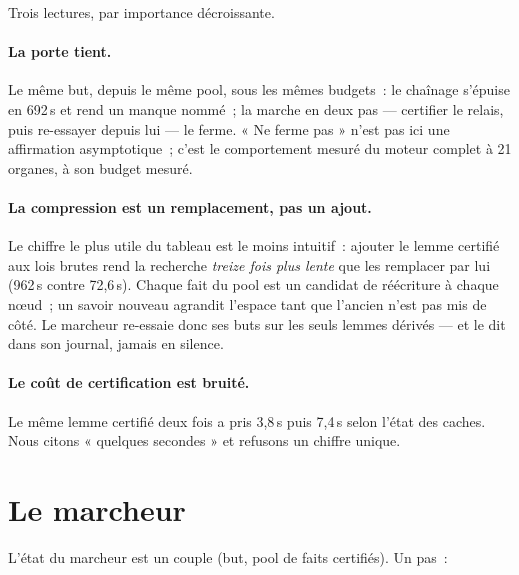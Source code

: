 \documentclass[11pt]{article}
\theoremstyle{remark}\newtheorem{remarque}{Remarque}
\begin{document}
Trois lectures, par importance décroissante.

\paragraph{La porte tient.} Le même but, depuis le même pool, sous les mêmes
budgets~: le chaînage s'épuise en 692\,s et rend un manque nommé~; la marche
en deux pas --- certifier le relais, puis re-essayer depuis lui --- le ferme.
« Ne ferme pas » n'est pas ici une affirmation asymptotique~; c'est le
comportement mesuré du moteur complet à 21 organes, à son budget mesuré.

\paragraph{La compression est un remplacement, pas un ajout.} Le chiffre le
plus utile du tableau est le moins intuitif~: ajouter le lemme certifié aux
lois brutes rend la recherche \emph{treize fois plus lente} que les remplacer
par lui (962\,s contre 72,6\,s). Chaque fait du pool est un candidat de
réécriture à chaque nœud~; un savoir nouveau agrandit l'espace tant que
l'ancien n'est pas mis de côté. Le marcheur re-essaie donc ses buts sur les
seuls lemmes dérivés --- et le dit dans son journal, jamais en silence.

\paragraph{Le coût de certification est bruité.} Le même lemme certifié deux
fois a pris 3,8\,s puis 7,4\,s selon l'état des caches. Nous citons
« quelques secondes » et refusons un chiffre unique.

\section{Le marcheur}
\label{sec:marcheur}

L'état du marcheur est un couple (but, pool de faits certifiés). Un pas~:
\end{document}

